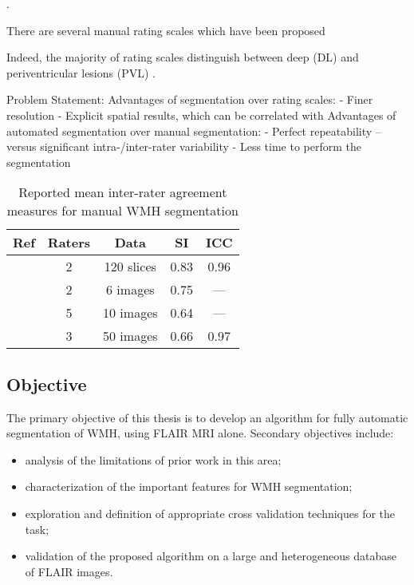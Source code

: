 \cite{Polman2011,Pantoni2002,Egger2017}.


There are several manual rating scales which have been proposed \cite{Fazekas1987,VanSwieten1990,Scheltens1993,Ylikoski1993,Manolio1994}


Indeed, the majority of rating scales distinguish between deep (DL) and periventricular lesions (PVL) \cite{Kim2008}.

Problem Statement:
Advantages of segmentation over rating scales:
- Finer resolution
- Explicit spatial results, which can be correlated with 
Advantages of automated segmentation over manual segmentation:
- Perfect repeatability -- versus significant intra-/inter-rater variability
- Less time to perform the segmentation



\begin{table}[h]
  \caption{Reported mean inter-rater agreement measures for manual WMH segmentation}
  \centering
  \begin{tabular}{ccccc}
    \hline
    Ref                  & Raters & Data       & SI   & ICC \\
    \hline
    \cite{Steenwijk2013} &      2 & 120 slices & 0.83 & 0.96 \\
    \cite{DeBoer2009b}   &      2 & 6 images   & 0.75 & ---  \\
    \cite{Harmouche2006} &      5 & 10 images  & 0.64 & ---  \\
    \cite{Egger2017}     &      3 & 50 images  & 0.66 & 0.97 \\
    \hline
  \end{tabular}
  \label{tab:interrater-cite}
\end{table}

\subsection{Objective}
The primary objective of this thesis is to develop an algorithm for fully automatic segmentation of WMH, using FLAIR MRI alone. Secondary objectives include:
\begin{itemize}
  \item analysis of the limitations of prior work in this area;
  \item characterization of the important features for WMH segmentation;
  \item exploration and definition of appropriate cross validation techniques for the task;
  \item validation of the proposed algorithm on a large and heterogeneous database of FLAIR images.
\end{itemize}
